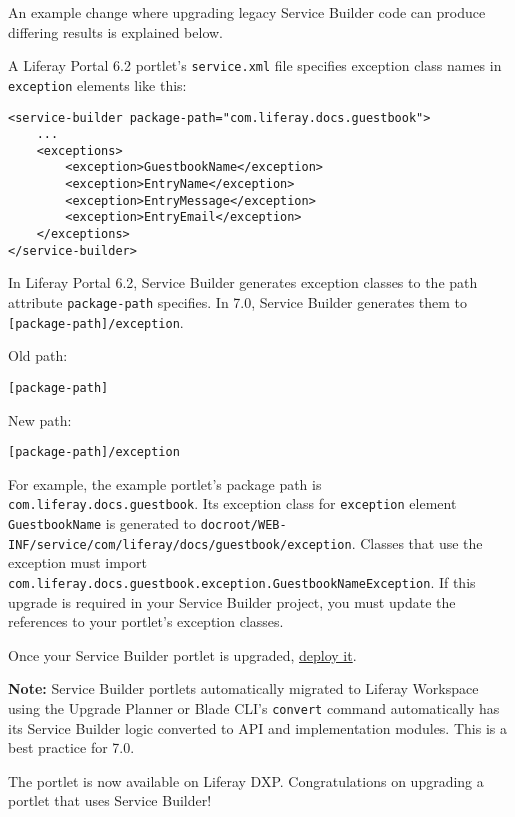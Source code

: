 An example change where upgrading legacy Service Builder code can
produce differing results is explained below.

A Liferay Portal 6.2 portlet's \texttt{service.xml} file specifies
exception class names in \texttt{exception} elements like this:

\begin{verbatim}
<service-builder package-path="com.liferay.docs.guestbook">
    ...
    <exceptions>
        <exception>GuestbookName</exception>
        <exception>EntryName</exception>
        <exception>EntryMessage</exception>
        <exception>EntryEmail</exception>
    </exceptions>
</service-builder>
\end{verbatim}

In Liferay Portal 6.2, Service Builder generates exception classes to
the path attribute \texttt{package-path} specifies. In 7.0, Service
Builder generates them to \texttt{{[}package-path{]}/exception}.

Old path:

\begin{verbatim}
[package-path]
\end{verbatim}

New path:

\begin{verbatim}
[package-path]/exception 
\end{verbatim}

For example, the example portlet's package path is
\texttt{com.liferay.docs.guestbook}. Its exception class for
\texttt{exception} element \texttt{GuestbookName} is generated to
\texttt{docroot/WEB-INF/service/com/liferay/docs/guestbook/exception}.
Classes that use the exception must import
\texttt{com.liferay.docs.guestbook.exception.GuestbookNameException}. If
this upgrade is required in your Service Builder project, you must
update the references to your portlet's exception classes.

Once your Service Builder portlet is upgraded,
\href{/docs/7-2/reference/-/knowledge_base/r/deploying-a-project}{deploy
it}.

\noindent\hrulefill

\textbf{Note:} Service Builder portlets automatically migrated to
Liferay Workspace using the Upgrade Planner or Blade CLI's
\texttt{convert} command automatically has its Service Builder logic
converted to API and implementation modules. This is a best practice for
7.0.

\noindent\hrulefill

The portlet is now available on Liferay DXP. Congratulations on
upgrading a portlet that uses Service Builder!

